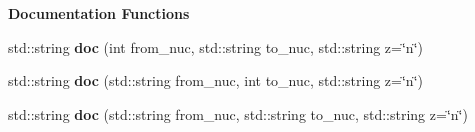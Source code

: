 \begin{Indent}{\bf Documentation Functions}
\begin{DoxyCompactItemize}
\item 
std\+::string {\bfseries doc} (int from\+\_\+nuc, std\+::string to\+\_\+nuc, std\+::string z=\char`\"{}n\char`\"{})\hypertarget{namespacepyne_1_1rxname_a9820e3543688dcdf357499919edd7f7c}{}\label{namespacepyne_1_1rxname_a9820e3543688dcdf357499919edd7f7c}

\item 
std\+::string {\bfseries doc} (std\+::string from\+\_\+nuc, int to\+\_\+nuc, std\+::string z=\char`\"{}n\char`\"{})\hypertarget{namespacepyne_1_1rxname_a9b097eed11efda815806880622391f7f}{}\label{namespacepyne_1_1rxname_a9b097eed11efda815806880622391f7f}

\item 
std\+::string {\bfseries doc} (std\+::string from\+\_\+nuc, std\+::string to\+\_\+nuc, std\+::string z=\char`\"{}n\char`\"{})\hypertarget{namespacepyne_1_1rxname_a4b8d25c68ceee23acdac2a537d2b951a}{}\label{namespacepyne_1_1rxname_a4b8d25c68ceee23acdac2a537d2b951a}

\end{DoxyCompactItemize}
\end{Indent}
